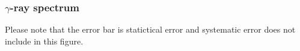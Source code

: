 \documentclass{beamer}
\begin{document}
\begin{frame}\frametitle{$\gamma$-ray spectrum}
  \begin{figure}
      \centering
  \end{figure}
  Please note that the error bar is statictical error and systematic error does not include in this figure.
\end{frame}
\end{document}
